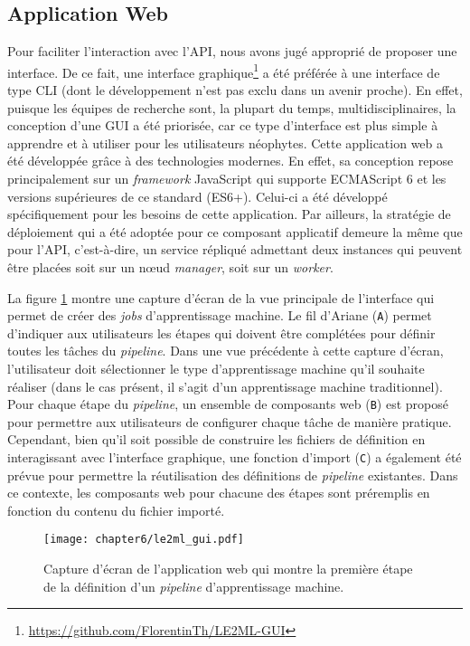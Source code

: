 \subsection{Application Web}

Pour faciliter l'interaction avec l'\acs{API}, nous avons jugé approprié de proposer une interface. De ce fait, une interface graphique\footnote{\url{https://github.com/FlorentinTh/LE2ML-GUI}} a été préférée à une interface de type \acs{CLI} (dont le développement n'est pas exclu dans un avenir proche). En effet, puisque les équipes de recherche sont, la plupart du temps, multidisciplinaires, la conception d'une \acs{GUI} a été priorisée, car ce type d'interface est plus simple à apprendre et à utiliser pour les utilisateurs néophytes. Cette application web a été développée grâce à des technologies modernes. En effet, sa conception repose principalement sur un \textit{framework} JavaScript qui supporte ECMAScript 6 et les versions supérieures de ce standard (ES6+). Celui-ci a été développé spécifiquement pour les besoins de cette application. Par ailleurs, la stratégie de déploiement qui a été adoptée pour ce composant applicatif demeure la même que pour l'\acs{API}, c'est-à-dire, un service répliqué admettant deux instances qui peuvent être placées soit sur un n\oe{}ud \textit{manager}, soit sur un \textit{worker}.

La figure \ref{fig:le2ml_gui} montre une capture d'écran de la vue principale de l'interface qui permet de créer des \textit{jobs} d'apprentissage machine. Le fil d'Ariane (\texttt{A}) permet d'indiquer aux utilisateurs les étapes qui doivent être complétées pour définir toutes les tâches du \textit{pipeline}. Dans une vue précédente à cette capture d'écran, l'utilisateur doit sélectionner le type d'apprentissage machine qu'il souhaite réaliser (dans le cas présent, il s'agit d'un apprentissage machine traditionnel). Pour chaque étape du \textit{pipeline}, un ensemble de composants web (\texttt{B}) est proposé pour permettre aux utilisateurs de configurer chaque tâche de manière pratique. Cependant, bien qu'il soit possible de construire les fichiers de définition en interagissant avec l'interface graphique, une fonction d'import (\texttt{C}) a également été prévue pour permettre la réutilisation des définitions de \textit{pipeline} existantes. Dans ce contexte, les composants web pour chacune des étapes sont préremplis en fonction du contenu du fichier importé.

\begin{figure}[H]
	\centering
	\texttt{[image: chapter6/le2ml\_gui.pdf]}
        \caption{Capture d'écran de l'application web qui montre la première étape de la définition d'un \textit{pipeline} d'apprentissage machine.}
	\label{fig:le2ml_gui}
\end{figure}

